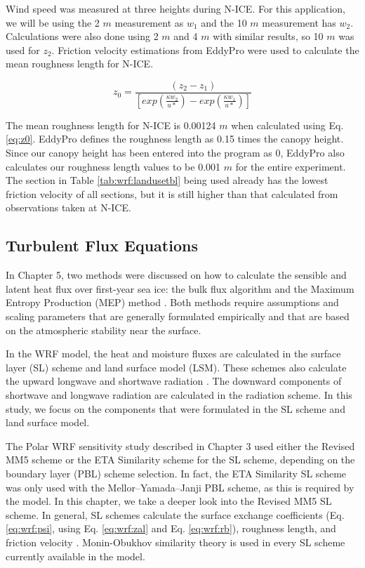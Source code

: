 Wind speed was measured at three heights during N-ICE. For this application, we will be using the 2 $m$ measurement as $w_{1}$ and the 10 $m$ measurement has $w_{2}$. Calculations were also done using 2 $m$ and 4 $m$ with similar results, so 10 $m$ was used for $z_{2}$. Friction velocity estimations from EddyPro were used to calculate the mean roughness length for N-ICE.

\begin{equation}\label{eq:z0}
 z_{0} = \frac{(z_{2}-z_{1})}{[exp(\frac{\kappa w_{2}}{u*}) - exp(\frac{\kappa w_{1}}{u*})]} 
\end{equation}

The mean roughness length for N-ICE is 0.00124 $m$ when calculated using Eq. \ref{eq:z0}. EddyPro defines the roughness length as 0.15 times the canopy height. Since our canopy height has been entered into the program as 0, EddyPro also calculates our roughness length values to be 0.001 $m$ for the entire experiment. The section in Table \ref{tab:wrf:landusetbl} being used already has the lowest friction velocity of all sections, but it is still higher than that calculated from observations taken at N-ICE. 

\subsection{Turbulent Flux Equations}
In Chapter 5, two methods were discussed on how to calculate the sensible and latent heat flux over first-year sea ice: the bulk flux algorithm \citep{foken:2008} and the Maximum Entropy Production (MEP) method \citep{zhang:2021, wang:2014, wang:2009}. Both methods require assumptions and scaling parameters that are generally formulated empirically and that are based on the atmospheric stability near the surface. 

In the WRF model, the heat and moisture fluxes are calculated in the surface layer (SL) scheme and land surface model (LSM). These schemes also calculate the upward longwave and shortwave radiation \citep{dudhia:2014, skamarock:2019}. The downward components of shortwave and longwave radiation are calculated in the radiation scheme. In this study, we focus on the components that were formulated in the SL scheme and land surface model. 

The Polar WRF sensitivity study described in Chapter 3 used either the Revised MM5 scheme \citep{paulson:1970, dyer:1970, webb:1970, beljaars:1994} or the ETA Similarity scheme for the SL scheme, depending on the boundary layer (PBL) scheme selection. In fact, the ETA Similarity SL scheme was only used with the Mellor–Yamada–Janji PBL scheme, as this is required by the model. In this chapter, we take a deeper look into the Revised MM5 SL scheme. In general, SL schemes calculate the surface exchange coefficients (Eq. \ref{eq:wrf:psi}, using Eq. \ref{eq:wrf:zal} and Eq. \ref{eq:wrf:rb}), roughness length, and friction velocity \citep{dudhia:2014}. Monin-Obukhov similarity theory is used in every SL scheme currently available in the model. 

